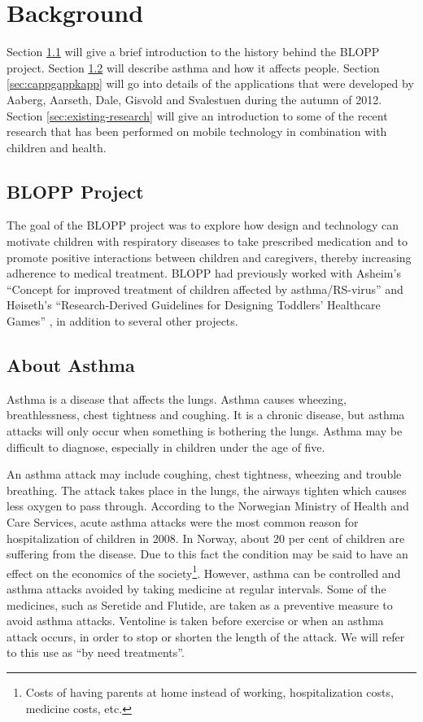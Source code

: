 \chapter{Background}
\label{chp:background}

Section \ref{sec:bloppproject} will give a brief introduction to the history behind the BLOPP project. Section \ref{sec:about-asthma} will describe asthma and how it affects people. Section \ref{sec:cappgappkapp} will go into details of the applications that were developed by Aaberg, Aarseth, Dale, Gisvold and Svalestuen during the autumn of 2012.     
Section \ref{sec:existing-research} will give an introduction to some of the recent research that has been performed on mobile technology in combination with children and health.   


\section{BLOPP Project}
\label{sec:bloppproject}
The goal of the BLOPP project was to explore how design and technology can motivate children with respiratory diseases to take prescribed medication and to promote positive interactions between children and caregivers, thereby increasing adherence to medical treatment. BLOPP had previously worked with Asheim's ``Concept for improved treatment of children affected by asthma/RS-virus''\cite{asheim2012konsept} and H\o iseth's ``Research-Derived Guidelines for Designing Toddlers' Healthcare Games'' \cite{hoiseth2013research}, in addition to several other projects.


\section{About Asthma}
\label{sec:about-asthma}
Asthma is a disease that affects the lungs. Asthma causes wheezing, breathlessness, chest tightness and coughing. It is a chronic disease, but asthma attacks will only occur when something is bothering the lungs. Asthma may be difficult to diagnose, especially in children under the age of five. 


An asthma attack may include coughing, chest tightness, wheezing and trouble breathing. The attack takes place in the lungs, the airways tighten which causes less oxygen to pass through.
According to the Norwegian Ministry of Health and Care Services, acute asthma attacks were the most common reason for hospitalization of children in 2008\cite{NationalStrategy}. In Norway, about 20 per cent of children are suffering from the disease. Due to this fact the condition may be said to have an effect on the economics of the society\footnote{Costs of having parents at home instead of working, hospitalization costs, medicine costs, etc.}. However, asthma can be controlled and asthma attacks avoided by taking medicine at regular intervals. Some of the medicines, such as Seretide and Flutide, are taken as a preventive measure to avoid asthma attacks. Ventoline is taken before exercise or when an asthma attack occurs, in order to stop or shorten the length of the attack. We will refer to this use as ``by need treatments''. 

